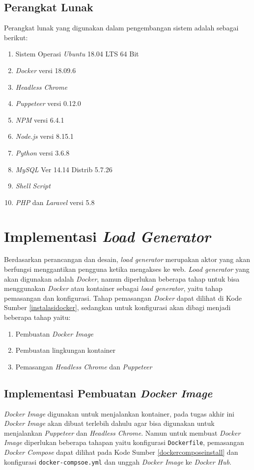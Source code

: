 		\subsection{Perangkat Lunak}
		Perangkat lunak yang digunakan dalam pengembangan sistem adalah sebagai berikut:
		\begin{enumerate}
			\item Sistem Operasi \textit{Ubuntu} 18.04 LTS 64 Bit
			\item \textit{Docker} versi 18.09.6 
			\item \textit{Headless Chrome} 
			\item \textit{Puppeteer} versi 0.12.0
			\item \textit{NPM} versi 6.4.1
			\item \textit{Node.js} versi 8.15.1
			\item \textit{Python} versi 3.6.8
			\item \textit{MySQL} Ver 14.14 Distrib 5.7.26
			\item \textit{Shell Script}
			\item \textit{PHP} dan \textit{Laravel} versi 5.8
		\end{enumerate}
		
	\section{Implementasi \textit{Load Generator}}
		Berdasarkan perancangan dan desain, \textit{load generator} merupakan aktor yang akan berfungsi menggantikan pengguna ketika mengakses ke web. \textit{Load generator} yang akan digunakan adalah \textit{Docker}, namun diperlukan beberapa tahap untuk bisa menggunakan \textit{Docker} atau kontainer sebagai \textit{load generator}, yaitu tahap pemasangan dan konfigurasi. Tahap pemasangan \textit{Docker} dapat dilihat di Kode Sumber \ref{instalasidocker}, sedangkan untuk konfigurasi akan dibagi menjadi beberapa tahap yaitu:
		\begin{enumerate}
			\item Pembuatan \textit{Docker Image}
			\item Pembuatan lingkungan kontainer
			\item Pemasangan \textit{Headless Chrome} dan \textit{Puppeteer}
		\end{enumerate}
			
		\subsection{Implementasi Pembuatan \textit{Docker Image}}
			\textit{Docker Image} digunakan untuk menjalankan kontainer, pada tugas akhir ini \textit{Docker Image} akan dibuat terlebih dahulu agar bisa digunakan untuk menjalankan \textit{Puppeteer} dan \textit{Headless Chrome}. Namun untuk membuat \textit{Docker Image} diperlukan beberapa tahapan yaitu konfigurasi \texttt{Dockerfile}, pemasangan \textit{Docker Compose} dapat dilihat pada Kode Sumber \ref{dockercomposeinstall} dan konfigurasi \texttt{docker-compsoe.yml} dan unggah \textit{Docker Image} ke \textit{Docker Hub}.
			

